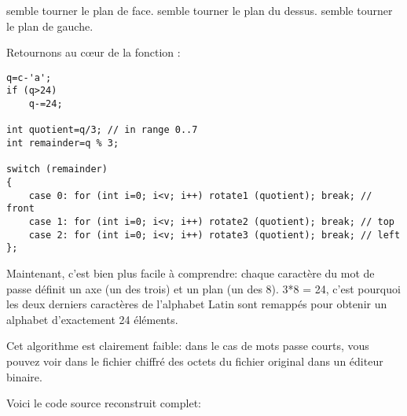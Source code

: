  semble tourner le plan de face.
 semble tourner le plan du dessus.
 semble tourner le plan de gauche.

Retournons au c\oe{}ur de la fonction :

\begin{lstlisting}[style=customc]
q=c-'a';
if (q>24)
	q-=24;

int quotient=q/3; // in range 0..7
int remainder=q % 3;

switch (remainder)
{
    case 0: for (int i=0; i<v; i++) rotate1 (quotient); break; // front
    case 1: for (int i=0; i<v; i++) rotate2 (quotient); break; // top
    case 2: for (int i=0; i<v; i++) rotate3 (quotient); break; // left
};
\end{lstlisting}

Maintenant, c'est bien plus facile à comprendre: chaque caractère du mot de passe
définit un axe (un des trois) et un plan (un des 8).
3*8 = 24, c'est pourquoi les deux derniers caractères de l'alphabet Latin sont remappés
pour obtenir un alphabet d'exactement 24 éléments.

Cet algorithme est clairement faible: dans le cas de mots passe courts, vous pouvez
voir dans le fichier chiffré des octets du fichier original dans un éditeur binaire.

Voici le code source reconstruit complet:



